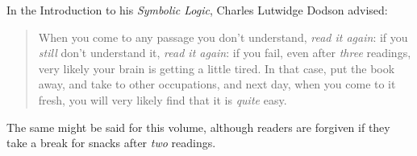 \vfill

In the Introduction to his \emph{Symbolic Logic}, Charles Lutwidge Dodson advised: \begin{quote}
	When you come to any passage you don't understand, \emph{read it again}: if you \emph{still} don't understand it, \emph{read it again}: if you fail, even after \emph{three} readings, very likely your brain is getting a little tired. In that case, put the book away, and take to other occupations, and next day, when you come to it fresh, you will very likely find that it is \emph{quite} easy.
\end{quote}



The same might be said for this volume, although readers are forgiven if they take a break for snacks after \emph{two} readings.




